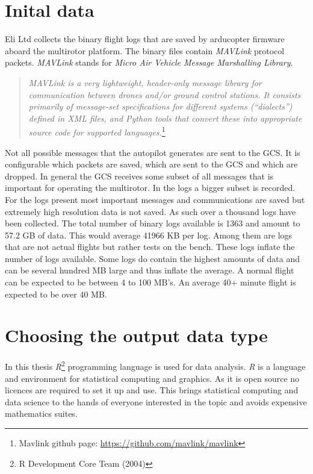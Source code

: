\documentclass[12pt,oneside]{reedthesis}
\theoremstyle{definition}
\theoremstyle{definition}
\theoremstyle{definition}
\theoremstyle{remark}
\begin{document}
\section{Inital data}\label{inital-data}

Eli Ltd collects the binary flight logs that are saved by arducopter
firmware aboard the multirotor platform. The binary files contain
\emph{MAVLink} protocol packets. \emph{MAVLink} stands for \emph{Micro
Air Vehicle Message Marshalling Library}.
\begin{quote}
\emph{MAVLink is a very lightweight, header-only message library for
communication between drones and/or ground control stations. It consists
primarily of message-set specifications for different systems
(``dialects'') defined in XML files, and Python tools that convert these
into appropriate source code for supported languages.}\footnote{Mavlink
  github page: \url{https://github.com/mavlink/mavlink}}
\end{quote}
Not all possible messages that the autopilot generates are sent to the
GCS. It is configurable which packets are saved, which are sent to the
GCS and which are dropped. In general the GCS receives some subset of
all messages that is important for operating the multirotor. In the logs
a bigger subset is recorded. For the logs present most important
messages and communications are saved but extremely high resolution data
is not saved. As such over a thousand logs have been collected. The
total number of binary logs available is 1363 and amount to 57.2 GB of
data. This would average 41966 KB per log. Among them are logs that are
not actual flights but rather tests on the bench. These logs inflate the
number of logs available. Some logs do contain the highest amounts of
data and can be several hundred MB large and thus inflate the average. A
normal flight can be expected to be between 4 to 100 MB's. An average
40+ minute flight is expected to be over 40 MB.

\hypertarget{choosing-the-output-data-type}{\section{Choosing the output
data type}\label{choosing-the-output-data-type}}

In this thesis \emph{R}\footnote{R Development Core Team (2004)}
programming language is used for data analysis. \emph{R} is a language
and environment for statistical computing and graphics. As it is open
source no licences are required to set it up and use. This brings
statistical computing and data science to the hands of everyone
interested in the topic and avoids expensive mathematics suites.
\end{document}
